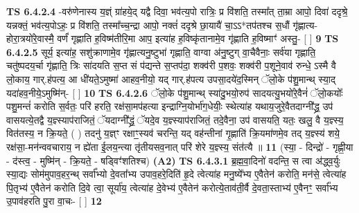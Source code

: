 \documentclass[17pt]{extarticle}
\begin{document}
                                \textbf{ TS 6.4.2.4} \newline
                  -वरु॑णेनास्य य॒ज्ञ्ं ग्रा॑हये॒द् यद्वै दिवा॒ भव॑त्य॒पो रात्रिः॒ प्र वि॑शति॒ तस्मा᳚त् ता॒म्रा आपो॒ दिवा॑ ददृश्रे॒ यन्नक्तं॒ भव॑त्य॒पोऽहः॒ प्र वि॑शति॒ तस्मा᳚च्च॒न्द्रा आपो॒ नक्तं॑ ददृश्रे छा॒यायै॑ चा॒ऽऽ*तप॑तश्च स॒धौं गृ॑ह्णात्य-होरा॒त्रयो॑रे॒वास्मै॒ वर्णं॑ गृह्णाति ह॒विष्म॑तीरि॒मा आप॒ इत्या॑ह ह॒विष्कृ॑तानामे॒व गृ॑ह्णाति ह॒विष्माꣳ॑ अस्तु॒- [  ] \textbf{  9} \newline
                  \newline
                                \textbf{ TS 6.4.2.5} \newline
                  सूर्य॒ इत्या॑ह॒ सशु॑क्राणामे॒व गृ॑ह्णात्यनु॒ष्टुभा॑ गृह्णाति॒ वाग्वा अ॑नु॒ष्टुग् वा॒चैवैनाः॒ सर्व॑या गृह्णाति॒ चतु॑ष्पदय॒र्चा गृ॑ह्णाति॒ त्रिः सा॑दयति स॒प्त सं प॑द्यन्ते स॒प्तप॑दा॒ शक्व॑री प॒शवः॒ शक्व॑री प॒शूने॒वाव॑ रुन्धे॒ ऽस्मै वै लो॒काय॒ गार्.ह॑पत्य॒ आ धी॑यते॒ऽमुष्मा॑ आहव॒नीयो॒ यद् गार्.ह॑पत्य उपसा॒दये॑द॒स्मिन् ॅलो॒के प॑शु॒मान्थ् स्या॒द् यदा॑हव॒नीये॒ऽमुष्मि॑न्- [  ] \textbf{  10} \newline
                  \newline
                                \textbf{ TS 6.4.2.6} \newline
                  ॅलो॒के प॑शु॒मान्थ् स्या॑दु॒भयो॒रुप॑ सादयत्यु॒भयो॑रे॒वैनं॑ ॅलो॒कयोः᳚ पशु॒मन्तं॑ करोति स॒र्वतः॒ परि॑ हरति॒ रक्ष॑सा॒मप॑हत्या इन्द्राग्नि॒योर्भा॑ग॒धेयीः॒ स्थेत्या॑ह यथाय॒जुरे॒वैतदाग्नी᳚द्ध्र॒ उप॑ वासयत्ये॒तद्वै य॒ज्ञ्स्याप॑राजितं॒ ॅयदाग्नी᳚द्ध्रं॒ ॅयदे॒व य॒ज्ञ्स्याप॑राजितं॒ तदे॒वैना॒ उप॑ वासयति॒ यतः॒ खलु॒ वै य॒ज्ञ्स्य॒ वित॑तस्य॒ न क्रि॒यते॒ ( ) तदनु॑ य॒ज्ञ्ꣳ रक्षाꣳ॒॒स्यव॑ चरन्ति॒ यद् वह॑न्तीनां गृ॒ह्णाति॑ क्रि॒यमा॑णमे॒व तद् य॒ज्ञ्स्य॑ शये॒ रक्ष॑सा॒-मन॑न्ववचाराय॒ न ह्ये॑ता ई॒लय॒न्त्या तृ॑तीयसव॒नात् परि॑ शेरे य॒ज्ञ्स्य॒ संत॑त्यै ॥ \textbf{  11} \newline
                  \newline
                      (स्या॒ - दिन्द्रो॑ - गृह्णी॒या - द॑स्त्व॒ - मुष्मि॑न् - क्रि॒यते॒ - षड्विꣳ॑शतिश्च)  \textbf{(A2)} \newline \newline
                                        \textbf{ TS 6.4.3.1} \newline
                  ब्र॒ह्म॒वा॒दिनो॑ वदन्ति॒ स त्वा अ॑द्ध्व॒र्युः स्या॒द्यः सोम॑मुपाव॒हर॒न्थ् सर्वा᳚भ्यो दे॒वता᳚भ्य उपाव॒हरे॒दिति॑ हृ॒दे त्वेत्या॑ह मनु॒ष्ये᳚भ्य ए॒वैतेन॑ करोति॒ मन॑से॒ त्वेत्या॑ह पि॒तृभ्य॑ ए॒वैतेन॑ करोति दि॒वे त्वा॒ सूर्या॑य॒ त्वेत्या॑ह दे॒वेभ्य॑ ए॒वैतेन॑ करोत्ये॒ताव॑ती॒र्वै दे॒वता॒स्ताभ्य॑ ए॒वैनꣳ॒॒ सर्वा᳚भ्य उ॒पाव॑हरति पु॒रा वा॒चः- [  ] \textbf{  12} \newline
\end{document}
